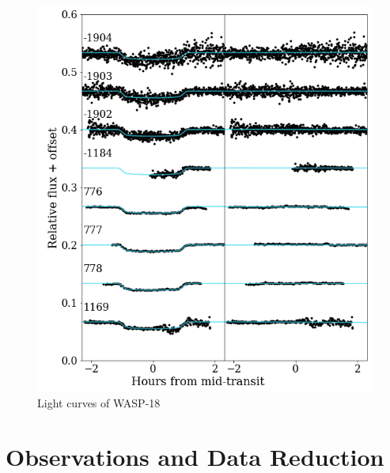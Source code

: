 \begin{figure}
\centering
\includegraphics[width=1.0\columnwidth]{imagenes/W18_LC.png}
\caption{Light curves of WASP-18 }
\label{lc_wasp18}
\end{figure}



\section{Observations and Data Reduction}

